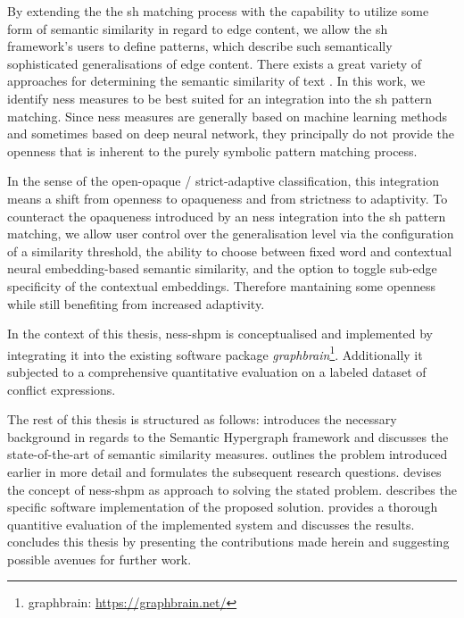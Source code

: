 \documentclass[11pt]{scrreprt}
\let\cite\parencite  %
\begin{document}
By extending the the \gls{sh} matching process with the capability to utilize some form of semantic similarity in regard to edge content, we allow the \gls{sh} framework's users to define patterns, which describe such semantically sophisticated generalisations of edge content.
There exists a great variety of approaches for determining the semantic similarity of text \cite{harispeSemanticSimilarityNatural2015, chandrasekaranEvolutionSemanticSimilarity2021}. In this work, we identify \gls{ness} measures to be best suited for an integration into the \gls{sh} pattern matching. Since \gls{ness} measures are generally based on machine learning methods and sometimes based on deep neural network, they principally do not provide the openness that is inherent to the purely symbolic pattern matching process.

 In the sense of the open-opaque / strict-adaptive classification, this integration means a shift from openness to opaqueness and from strictness to adaptivity. To counteract the opaqueness introduced by an \gls{ness} integration into the \gls{sh} pattern matching, we allow user control over the generalisation level via the configuration of a similarity threshold, the ability to choose between fixed word and contextual neural embedding-based semantic similarity, and the option to toggle sub-edge specificity of the contextual embeddings. Therefore mantaining some openness while still benefiting from increased adaptivity.

In the context of this thesis, \gls{ness-shpm} is conceptualised and implemented by integrating it into the existing software package \textit{graphbrain}\footnote{graphbrain: \url{https://graphbrain.net/}}. Additionally it subjected to a comprehensive quantitative evaluation on a labeled dataset of conflict expressions.

The rest of this thesis is structured as follows:  introduces the necessary background in regards to the Semantic Hypergraph framework and discusses the state-of-the-art of semantic similarity measures.  outlines the problem introduced earlier in more detail and formulates the subsequent research questions.  devises the concept of \gls{ness-shpm} as approach to solving the stated problem.  describes the specific software implementation of the proposed solution.  provides a thorough quantitive evaluation of the implemented system and discusses the results. 
 concludes this thesis by presenting the contributions made herein and suggesting possible avenues for further work.
\end{document}
